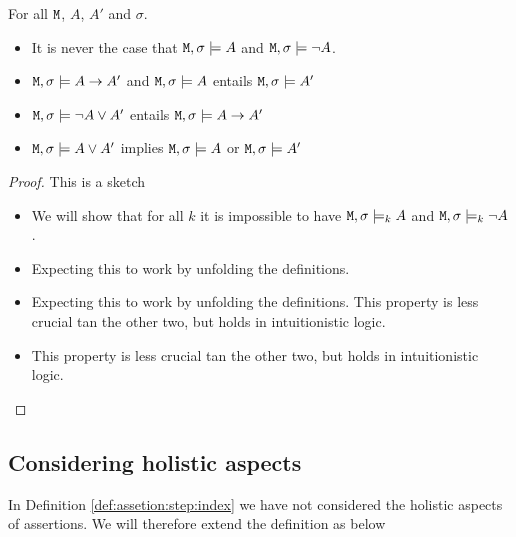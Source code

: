 \documentclass[acmsmall,screen]{acmart}
\begin{document}
\begin{conjecture}[Consistency]
For all ${\mbox{\tt{M}}}$, $A$, $A'$ and $\sigma$.

\begin{itemize}
\item
 It is never the case that ${\mbox{\tt{M}}}, \sigma \models  A$  and  ${\mbox{\tt{M}}}, \sigma \models   \neg A $.
 \item
 ${\mbox{\tt{M}}}, \sigma \models  A \rightarrow A' $ and  ${\mbox{\tt{M}}}, \sigma \models  A$ entails  ${\mbox{\tt{M}}}, \sigma \models  A'$
 \item
  ${\mbox{\tt{M}}}, \sigma \models  \neg A \vee A' $ entails  ${\mbox{\tt{M}}}, \sigma \models   A \rightarrow A' $
  \item
 ${\mbox{\tt{M}}}, \sigma \models  A \vee A' $ implies ${\mbox{\tt{M}}}, \sigma \models   A $ or  ${\mbox{\tt{M}}}, \sigma \models  A' $
\end{itemize}

\end{conjecture}
\begin{proof} This is a sketch

\begin{itemize}
\item
 We will show that for all $k$ it is impossible to have ${\mbox{\tt{M}}}, \sigma \models_k  A  $ and  ${\mbox{\tt{M}}}, \sigma \models_k  \neg A$.
 \item
 Expecting this to work by unfolding the definitions.
 \item
Expecting this to work by unfolding the definitions. This property is less crucial tan the other two, but holds in intuitionistic logic.
 \item
 This property is less crucial tan the other two, but holds in intuitionistic logic.
\end{itemize}
\end{proof}

\subsection{Considering holistic aspects}

In  Definition \ref{def:assetion:step:index} we have not considered the holistic aspects of assertions. We will therefore extend the definition as below
\end{document}
